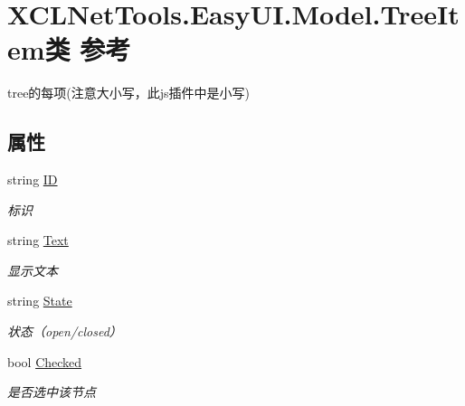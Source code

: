 \hypertarget{class_x_c_l_net_tools_1_1_easy_u_i_1_1_model_1_1_tree_item}{\section{X\-C\-L\-Net\-Tools.\-Easy\-U\-I.\-Model.\-Tree\-Item类 参考}
\label{class_x_c_l_net_tools_1_1_easy_u_i_1_1_model_1_1_tree_item}
}


tree的每项(注意大小写，此js插件中是小写)  


\subsection*{属性}
\begin{DoxyCompactItemize}
\item 
string \hyperlink{class_x_c_l_net_tools_1_1_easy_u_i_1_1_model_1_1_tree_item_a635170217739e75fdba2af13f8832b11}{I\-D}
\begin{DoxyCompactList}\small\item\em 标识 \end{DoxyCompactList}\item 
string \hyperlink{class_x_c_l_net_tools_1_1_easy_u_i_1_1_model_1_1_tree_item_a02915b13c54f2f0980e9888209da0a17}{Text}
\begin{DoxyCompactList}\small\item\em 显示文本 \end{DoxyCompactList}\item 
string \hyperlink{class_x_c_l_net_tools_1_1_easy_u_i_1_1_model_1_1_tree_item_a3b664ea234076c4f0ca6e550c5f7b106}{State}
\begin{DoxyCompactList}\small\item\em 状态（open/closed） \end{DoxyCompactList}\item 
bool \hyperlink{class_x_c_l_net_tools_1_1_easy_u_i_1_1_model_1_1_tree_item_a0db803b6afa7de1c624b40c4e1ac6594}{Checked}
\begin{DoxyCompactList}\small\item\em 是否选中该节点 \end{DoxyCompactList}\item 

\end{DoxyCompactItemize}
